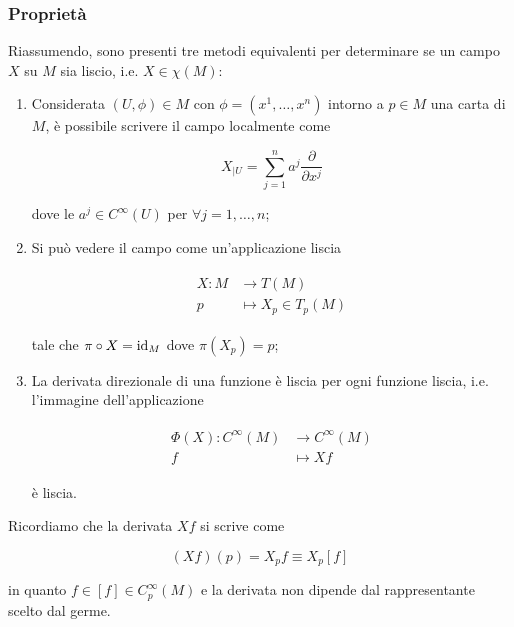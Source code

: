 \subsubsection{Proprietà}

Riassumendo, sono presenti tre metodi equivalenti per determinare se un campo $ X $ su $ M $ sia liscio, i.e. $ X \in \chi(M) $:

\begin{enumerate}
	\item Considerata $ (U,\phi) \in M $ con $ \phi = (x^{1},\dots,x^{n}) $ intorno a $ p \in M $ una carta di $ M $, è possibile scrivere il campo localmente come
	
	\begin{equation}
		X_{|U} = \sum_{j=1}^{n} a^{j} \dfrac{\partial}{\partial x^{j}}
	\end{equation}

	dove le $ a^{j} \in C^{\infty}(U) $ per $ \forall j=1,\dots,n $;
	
	\item Si può vedere il campo come un'applicazione liscia
	
	\begin{align}
		\begin{split}
			X : M &\to T(M)\\
			p &\mapsto X_{p} \in T_{p}(M)
		\end{split}
	\end{align}
	
	tale che $ \pi \circ X = \operatorname{id}_{M} $ dove $ \pi(X_{p})=p $;
	
	\item La derivata direzionale di una funzione è liscia per ogni funzione liscia, i.e. l'immagine dell'applicazione
	
	\begin{align}
		\begin{split}
			\Phi(X) : C^{\infty}(M) &\to C^{\infty}(M)\\
			f &\mapsto X f
		\end{split}
	\end{align}

	è liscia.
\end{enumerate}

Ricordiamo che la derivata $ X f $ si scrive come

\begin{equation}
	(X f)(p) = X_{p} f \equiv X_{p} [f]
\end{equation}

in quanto $ f \in [f] \in C_{p}^{\infty}(M) $ e la derivata non dipende dal rappresentante scelto dal germe.

